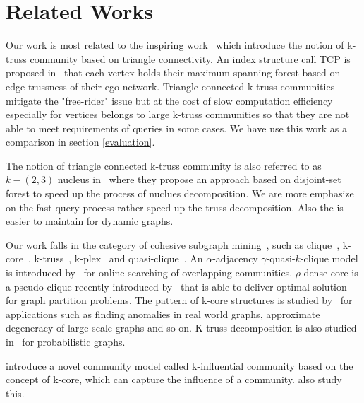 \section{Related Works}
\label{relatedwork} 

Our work is most related to the inspiring work~\cite{huang2014querying} which introduce the notion of k-truss community based on triangle connectivity. An index structure call TCP is proposed in~\cite{huang2014querying} that each vertex holds their maximum spanning forest based on edge trussness of their ego-network. Triangle connected k-truss communities mitigate the "free-rider" issue but at the cost of slow computation efficiency especially for vertices belongs to large k-truss communities so that they are not able to meet requirements of queries in some cases. We have use this work as a comparison in section \autoref{evaluation}.

The notion of triangle connected k-truss community is also referred to as $k-(2,3)$ nucleus in~\cite{sariyuce2016fast} where they propose an approach based on disjoint-set forest to speed up the process of nuclues decomposition. We are more emphasize on the fast query process rather speed up the truss decomposition. Also the \treeindex{} is easier to maintain for dynamic graphs.

Our work falls in the category of cohesive subgraph mining~\cite{huang2017community,koujaku2016dense,sozio2010community,cui2014local,li2015influential,cui2013online,mcauley2012learning}, such as clique~\cite{bron1973algorithm,rossi2014fast}, k-core~\cite{cheng2011efficient,shin2016corescope,barbieri2015efficient,li2017discovering}, k-truss~\cite{huang2014querying,wang2012truss,cohen2008trusses,huang2015approximate,huang2016truss,zheng2017finding}, k-plex~\cite{wangquery} and quasi-clique~\cite{tsourakakis2013denser, lee2016query}. An $\alpha$-adjacency $\gamma$-quasi-$k$-clique model is introduced by~\cite{cui2014local} for online searching of overlapping communities. $\rho$-dense core is a pseudo clique recently introduced by~\cite{koujaku2016dense} that is able to deliver optimal solution for graph partition problems. The pattern of k-core structures is studied by~\cite{shin2016corescope} for applications such as finding anomalies in real world graphs, approximate degeneracy of large-scale graphs and so on. K-truss decomposition is also studied in~\cite{huang2016truss, zou2017truss} for probabilistic graphs.

\cite{li2015influential} introduce a novel community model called k-influential community based on the concept of k-core, which can capture the influence of a community. \cite{chen2016efficient,chang2017mathsf,li2017finding,bi2017optimal,li2017most} also study this.

